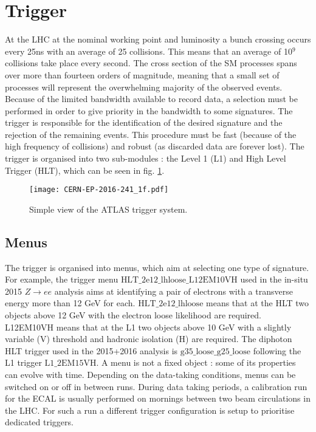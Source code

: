 \section{Trigger}
\label{sec:org90db134}
\label{sec:Detector_Trigger}

At the LHC at the nominal working point and luminosity a bunch crossing occurs every 25ns with an average of 25 collisions.
This means that an average of 10\(^{\text{9}}\) collisions take place every second.
The cross section of the SM processes spans over more than fourteen orders of magnitude, meaning that a small set of processes will represent the overwhelming majority of the observed events.
Because of the limited bandwidth available to record data, a selection must be performed in order to give priority in the bandwidth to some signatures.
The trigger \cite{CERN-EP-2016-241,CERN-PH-EP-2011-078} is responsible for the identification of the desired signature and the rejection of the remaining events.
This procedure must be fast (because of the high frequency of collisions) and robust (as discarded data are forever lost).
The trigger is organised into two sub-modules : the Level 1 (L1) and High Level Trigger (HLT), which can be seen in fig. \ref{fig:org4a2d846}.

\begin{figure}[htbp]
\centering
\texttt{[image: CERN-EP-2016-241\_1f.pdf]}
\caption{\label{fig:org4a2d846}
Simple view of the ATLAS trigger system.\cite{CERN-EP-2016-241}}
\end{figure}


\subsection{Menus}
\label{sec:org5d5bf3d}

The trigger is organised into menus, which aim at selecting one type of signature.
For example, the trigger menu \(\text{HLT\_2e12\_lhloose\_L12EM10VH}\) used in the in-situ 2015 $Z\rightarrow ee$ analysis aims at identifying a pair of electrons with a transverse energy more than 12 GeV for each.
\(\text{HLT\_2e12\_lhloose}\) means that at the HLT two objects above 12 GeV with the electron loose likelihood are required.
L12EM10VH means that at the L1 two objects above 10 GeV with a slightly variable (V) threshold and hadronic isolation (H) are required.
The diphoton HLT trigger used in the 2015+2016 analysis is \(\text{g35\_loose\_g25\_loose}\) following the L1 trigger \(\text{L1\_2EM15VH}\).
A menu is not a fixed object : some of its properties can evolve with time.
Depending on the data-taking conditions, menus can be switched on or off in between runs.
During data taking periods, a calibration run for the ECAL is usually performed on mornings between two beam circulations in the LHC.
For such a run a different trigger configuration is setup to prioritise dedicated triggers.

